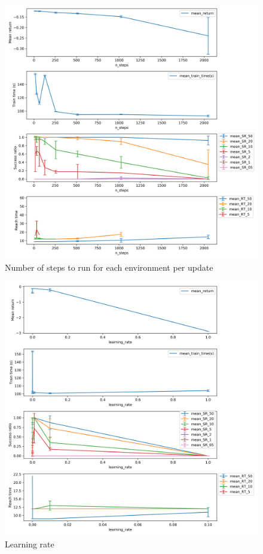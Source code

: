 \documentclass{article}
\begin{document}
\begin{figure}[H]
    \centering
    \includegraphics[width=\textwidth]{../ppo2_n_steps.png}
\caption{Number of steps to run for each environment per update}
\end{figure}

\begin{figure}[H]
    \centering
    \includegraphics[width=\textwidth]{../ppo2_learning_rate.png}
\caption{Learning rate}
\end{figure}
\end{document}
